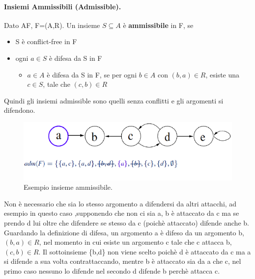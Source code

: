 \paragraph{Insiemi Ammissibili (Admissible).} Dato AF, F=(A,R). Un insieme $S \subseteq A$ è \textbf{ammissibile} in F, se 
\begin{itemize}
    \item S è conflict-free in F
    \item ogni $a\in S$ è difesa da S in F
    \begin{itemize}
        \item  $a\in A$ è difesa da S in F, se per ogni $b\in A$ con $(b,a) \in R$, esiste una $c\in S$, tale che $(c,b)\in R $
    \end{itemize}
\end{itemize}
Quindi gli insiemi admissible sono quelli senza conflitti e gli argomenti si difendono.
\begin{figure}[H]
    \centering
    \includegraphics[width=13cm, keepaspectratio]{img/es_insieme_ammissibile.png}
    \caption{Esempio insieme ammissibile.}\label{fig:es_insieme_ammissibile}
\end{figure}
Non è necessario che sia lo stesso argomento a difendersi da altri attacchi, ad esempio in questo caso ,supponendo che non ci sia a, b è attaccato da c ma  se prendo d lui oltre che difendere se stesso da c (poichè attaccato) difende anche b. Guardando la definizione di difesa, un argomento a è difeso da un argomento b, $(b,a) \in R$, nel momento in cui esiste un argomento c tale che c attacca b, $(c,b) \in R$. Il sottoinsieme \{b,d\} non viene scelto poichè d è attaccato da c ma a si difende a sua volta contrattaccando, mentre b è attaccato sia da a che c, nel primo caso nessuno lo difende nel secondo d difende b perchè attacca c.

